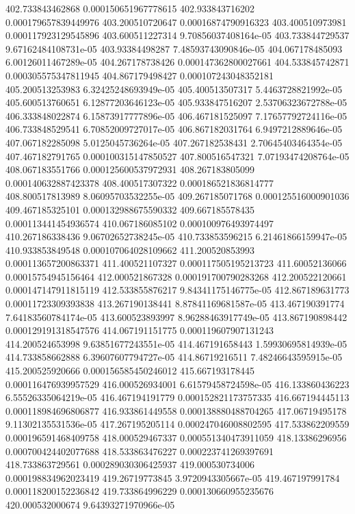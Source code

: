 {402.733843462868 0.000150651967778615
402.933843716202 0.000179657839449976
403.200510720647 0.00016874790916323
403.400510973981 0.000117923129545896
403.600511227314 9.70856037408164e-05
403.733844729537 9.67162484108731e-05
403.93384498287 7.48593743090846e-05
404.067178485093 6.00126011467289e-05
404.267178738426 0.000147362800027661
404.533845742871 0.000305575347811945
404.867179498427 0.000107243048352181
405.200513253983 6.32425248693949e-05
405.400513507317 5.4463728821992e-05
405.600513760651 6.12877203646123e-05
405.933847516207 2.53706323672788e-05
406.333848022874 6.15873917777896e-05
406.467181525097 7.17657792724116e-05
406.733848529541 6.70852009727017e-05
406.867182031764 6.9497212889646e-05
407.067182285098 5.0125045736264e-05
407.267182538431 2.70645403464354e-05
407.467182791765 0.000100315147850527
407.800516547321 7.07193474208764e-05
408.067183551766 0.000125600537972931
408.267183805099 0.000140632887423378
408.400517307322 0.000186521836814777
408.800517813989 8.06095703532255e-05
409.267185071768 0.000125516000901036
409.467185325101 0.000132988675590332
409.667185578435 0.000113441454936574
410.067186085102 0.000100976493974497
410.267186338436 9.06702652738245e-05
410.733853596215 6.21461866159947e-05
410.933853849548 0.000107064028109662
411.200520853993 0.000113657200863371
411.400521107327 0.000117505195213723
411.60052136066 0.00015754945156464
412.000521867328 0.000191700790283268
412.200522120661 0.000147147911815119
412.533855876217 9.84341175146775e-05
412.867189631773 0.00011723309393838
413.267190138441 8.87841169681587e-05
413.467190391774 7.64183560784174e-05
413.600523893997 8.96288463917749e-05
413.867190898442 0.000129191318547576
414.067191151775 0.000119607907131243
414.200524653998 9.63851677243551e-05
414.467191658443 1.59930695814939e-05
414.733858662888 6.39607607794727e-05
414.86719216511 7.48246643595915e-05
415.200525920666 0.000156585450246012
415.667193178445 0.000116476939957529
416.000526934001 6.61579458724598e-05
416.133860436223 6.55526335064219e-05
416.467194191779 0.000152821173757335
416.667194445113 0.000118984696806877
416.933861449558 0.000138880488704265
417.06719495178 9.11302135531536e-05
417.267195205114 0.000247046008802595
417.533862209559 0.000196591468409758
418.000529467337 0.000551340473911059
418.13386296956 0.000700424402077688
418.533863476227 0.000223741269397691
418.733863729561 0.000289030306425937
419.000530734006 0.000198834962023419
419.26719773845 3.9720943305667e-05
419.467197991784 0.000118200152236842
419.733864996229 0.000130660955235676
420.000532000674 9.64393271970966e-05
}
